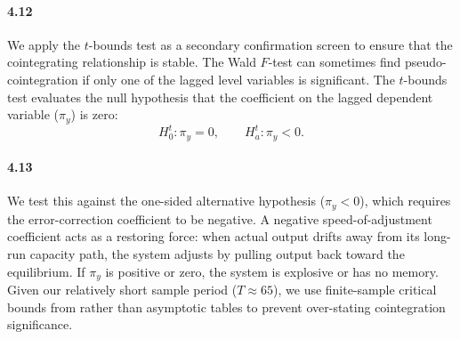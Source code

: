 \paragraph{4.12}
We apply the $t$-bounds test as a secondary confirmation screen to ensure that the cointegrating relationship is stable. The Wald $F$-test can sometimes find pseudo-cointegration if only one of the lagged level variables is significant. The $t$-bounds test evaluates the null hypothesis that the coefficient on the lagged dependent variable ($\pi_y$) is zero:
\begin{equation}
H_{0}^{t}: \pi_y=0, \qquad H_{a}^{t}: \pi_y<0.
\label{eq:tbounds_hypothesis}
\end{equation}

\paragraph{4.13}
We test this against the one-sided alternative hypothesis ($\pi_y < 0$), which requires the error-correction coefficient to be negative. A negative speed-of-adjustment coefficient acts as a restoring force: when actual output drifts away from its long-run capacity path, the system adjusts by pulling output back toward the equilibrium. If $\pi_y$ is positive or zero, the system is explosive or has no memory. Given our relatively short sample period ($T \approx 65$), we use finite-sample critical bounds from \citet{NatsiopoulosTzeremes2022} rather than asymptotic tables to prevent over-stating cointegration significance.


